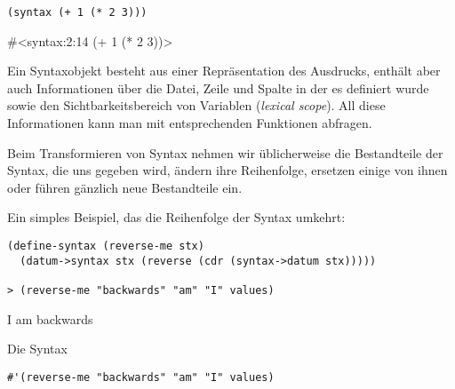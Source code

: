 \begin{lstlisting}
(syntax (+ 1 (* 2 3)))
\end{lstlisting}
{\routput\#<syntax:2:14 (+ 1 (* 2 3))>}

Ein Syntaxobjekt besteht aus einer Repräsentation des Ausdrucks, enthält aber auch Informationen über die Datei, Zeile und Spalte in der es definiert wurde sowie den Sichtbarkeitsbereich von Variablen (\emph{lexical scope}). All diese Informationen kann man mit entsprechenden Funktionen abfragen.%
% 
% 
% 
% 
% 
% 

Beim Transformieren von Syntax nehmen wir üblicherweise die Bestandteile der Syntax, die uns gegeben wird, ändern ihre Reihenfolge, ersetzen einige von ihnen oder führen gänzlich neue Bestandteile ein.

Ein simples Beispiel, das die Reihenfolge der Syntax umkehrt:

\begin{lstlisting}
(define-syntax (reverse-me stx)
  (datum->syntax stx (reverse (cdr (syntax->datum stx)))))
  
> (reverse-me "backwards" "am" "I" values)
\end{lstlisting}
{\routput {\qq}I{\qq} {\qq}am{\qq} {\qq}backwards{\qq}}

Die Syntax

\begin{lstlisting}
#'(reverse-me "backwards" "am" "I" values)
\end{lstlisting}

